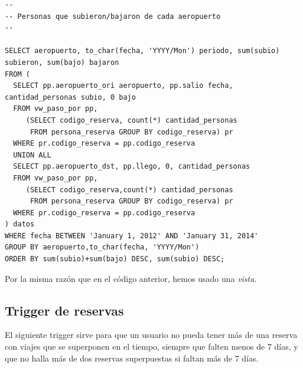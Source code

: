 \documentclass[a4paper,10pt]{article}
\begin{document}
\newpage

\begin{verbatim}
--
-- Personas que subieron/bajaron de cada aeropuerto
--

SELECT aeropuerto, to_char(fecha, 'YYYY/Mon') periodo, sum(subio) subieron, sum(bajo) bajaron 
FROM (
  SELECT pp.aeropuerto_ori aeropuerto, pp.salio fecha, cantidad_personas subio, 0 bajo
  FROM vw_paso_por pp,
     (SELECT codigo_reserva, count(*) cantidad_personas
      FROM persona_reserva GROUP BY codigo_reserva) pr
  WHERE pr.codigo_reserva = pp.codigo_reserva
  UNION ALL
  SELECT pp.aeropuerto_dst, pp.llego, 0, cantidad_personas
  FROM vw_paso_por pp,
     (SELECT codigo_reserva,count(*) cantidad_personas
      FROM persona_reserva GROUP BY codigo_reserva) pr
  WHERE pr.codigo_reserva = pp.codigo_reserva
) datos
WHERE fecha BETWEEN 'January 1, 2012' AND 'January 31, 2014'
GROUP BY aeropuerto,to_char(fecha, 'YYYY/Mon')
ORDER BY sum(subio)+sum(bajo) DESC, sum(subio) DESC;

\end{verbatim}

Por la misma razón que en el código anterior, hemos usado una \textit{vista}.


\subsection{Trigger de reservas}

El siguiente trigger sirve para que un usuario no pueda tener m\'as de una reserva con viajes que se superponen en el tiempo, siempre que falten menos de 7 d\'ias, y que no halla m\'as de dos reservas superpuestas si faltan m\'as de 7 d\'ias.
\end{document}
